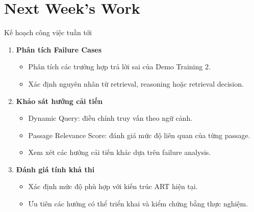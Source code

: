 
\section{Next Week's Work}

\begin{frame}{Kế hoạch công việc tuần tới}

\begin{enumerate}
    \item \textbf{Phân tích Failure Cases}
    \begin{itemize}
        \item Phân tích các trường hợp trả lời sai của Demo Training 2.
        \item Xác định nguyên nhân từ retrieval, reasoning hoặc retrieval decision.
    \end{itemize}

    \vspace{0.3cm}

    \item \textbf{Khảo sát hướng cải tiến}
    \begin{itemize}
        \item Dynamic Query: điều chỉnh truy vấn theo ngữ cảnh.
        \item Passage Relevance Score: đánh giá mức độ liên quan của từng passage.
        \item Xem xét các hướng cải tiến khác dựa trên failure analysis.
    \end{itemize}

    \vspace{0.3cm}

    \item \textbf{Đánh giá tính khả thi}
    \begin{itemize}
        \item Xác định mức độ phù hợp với kiến trúc ART hiện tại.
        \item Ưu tiên các hướng có thể triển khai và kiểm chứng bằng thực nghiệm.
    \end{itemize}
\end{enumerate}

\end{frame}